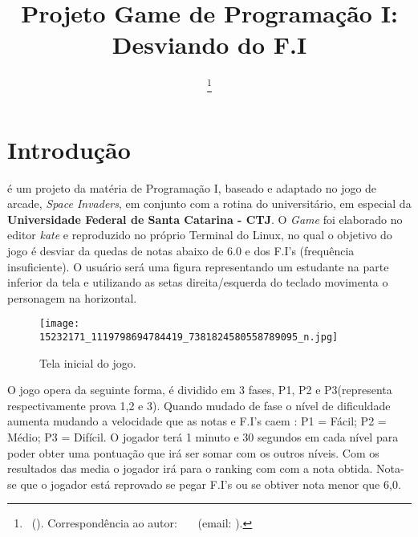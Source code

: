 \documentclass[journal]{IEEEtran}
\title                                                {Projeto Game de Programação I: Desviando do F.I}
\author{\IEEEauthorblockN{\prenome2~\nomedomeio2~\sobrenome2\IEEEauthorrefmark{2}, 
\prenome3~\nomedomeio3~\sobrenome3\IEEEauthorrefmark{3}\IEEEmembership{}}

 \IEEEauthorblockA{\IEEEauthorrefmark{1}Universidade Federal de Santa Catarina (UFSC).}
 
  \thanks{\Revista~(\siglaRevista). Correspond\^encia ao autor: \prenomePrincipal~\nomedomeioPrincipal~\sobrenomePrincipal~(email: \emailautor).}}
\begin{document}
\maketitle
\IEEEdisplaynontitleabstractindextext
\IEEEpeerreviewmaketitle


\section{Introdução}


 é um projeto da matéria de Programação I, baseado e adaptado no jogo de arcade, \textit{Space Invaders}, em conjunto com a rotina do universitário, em especial da \textbf{Universidade Federal de Santa Catarina - CTJ}. O \textit{Game}  foi elaborado no editor \textit{kate} e reproduzido no próprio {Terminal} do Linux, no qual o objetivo do jogo é desviar da quedas de notas abaixo de 6.0 e dos F.I’s (frequência insuficiente). O usuário será uma figura representando um estudante na parte inferior da tela e utilizando as setas direita/esquerda do teclado movimenta o personagem na horizontal.

\begin{figure}[!htbp]
\centering
\texttt{[image: 15232171\_1119798694784419\_7381824580558789095\_n.jpg]}
\caption{Tela inicial do jogo.}
\label{fig:fig_exemple}
\end{figure}



O jogo opera da seguinte forma, é dividido em 3 fases, P1, P2 e P3(representa respectivamente prova 1,2 e 3). Quando mudado de fase o nível de dificuldade aumenta mudando a velocidade que as notas e F.I's caem : P1 = Fácil; P2 = Médio; P3 = Difícil.  
O jogador terá 1 minuto e 30 segundos em cada nível para poder obter uma pontuação que irá ser somar com os outros níveis. Com os resultados das media o jogador irá para o ranking com com a nota obtida. Nota-se que o jogador está reprovado se pegar F.I's ou se obtiver nota menor  que 6,0.


\end{document}
